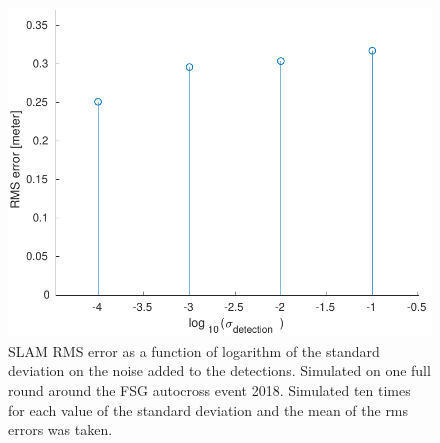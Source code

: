 \begin{figure}
    \centering
    \includegraphics[width=0.8\linewidth]{0_Images/6_Results/SLAMERMS.pdf}
    \caption[SLAM RMS error as a function of logarithm of the standard deviation on the noise added to the detections.]
    {SLAM RMS error as a function of logarithm of the standard deviation on the noise added to the detections. Simulated on one full round around the FSG autocross event 2018. Simulated ten times for each value of the standard deviation and the mean of the rms errors was taken.}
    \label{Fig:SLAMERMS}
\end{figure}